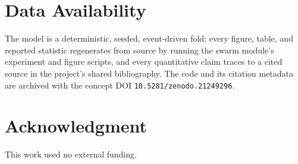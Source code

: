 \section*{Data Availability}
The model is a deterministic, seeded, event-driven fold; every figure, table, and reported
statistic regenerates from source by running the swarm module's experiment and figure scripts,
and every quantitative claim traces to a cited source in the project's shared bibliography. The
code and its citation metadata are archived with the concept DOI \texttt{10.5281/zenodo.21249296}.

\section*{Acknowledgment}
This work used no external funding.
